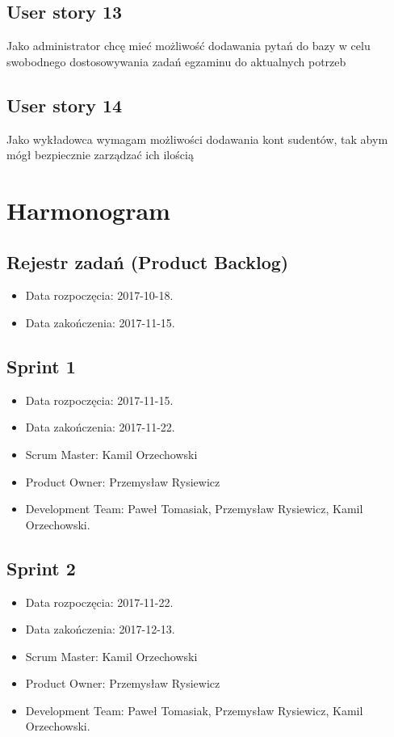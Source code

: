 \documentclass[a4paper]{article}
\begin{document}
\subsection{User story 13}

Jako administrator chcę mieć możliwość dodawania pytań do bazy w celu swobodnego dostosowywania zadań egzaminu do aktualnych potrzeb

\subsection{User story 14}

Jako wykładowca wymagam możliwości dodawania kont sudentów, tak abym mógł bezpiecznie zarządzać ich ilością

\section{Harmonogram}

\subsection{Rejestr zadań (Product Backlog)}

\begin{itemize}
\item Data rozpoczęcia: 2017-10-18.
\item  Data zakończenia: 2017-11-15.
\end{itemize}


\subsection{Sprint 1}

\begin{itemize}
\item Data rozpoczęcia: 2017-11-15.
\item  Data zakończenia: 2017-11-22.
\item Scrum Master: Kamil Orzechowski
\item Product Owner: Przemysław Rysiewicz
\item Development Team: Paweł Tomasiak, Przemysław Rysiewicz, Kamil Orzechowski.
\end{itemize}

\subsection{Sprint 2}

\begin{itemize}
\item Data rozpoczęcia: 2017-11-22.
\item  Data zakończenia: 2017-12-13.
\item Scrum Master: Kamil Orzechowski
\item Product Owner: Przemysław Rysiewicz
\item Development Team: Paweł Tomasiak, Przemysław Rysiewicz, Kamil Orzechowski.
\end{itemize}
\end{document}
